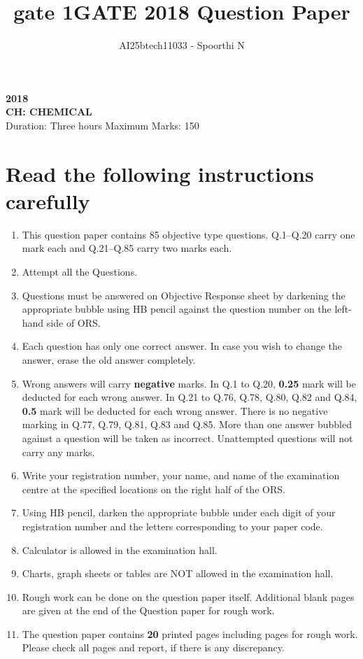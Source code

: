 \documentclass[journal,12pt,onecolumn]{IEEEtran}
\theoremstyle{remark}
\begin{document}
\title{gate 1}
\renewcommand{\thefigure}{\theenumi}
\renewcommand{\thetable}{\theenumi}

\title{GATE 2018 Question Paper}
\author{AI25btech11033 - Spoorthi N}
\maketitle

\begin{center}
\large \textbf{2018}\\[1ex]
\large \textbf{CH: CHEMICAL}\\[2ex]
{Duration: Three hours \hfill Maximum Marks: 150}
\end{center}

\section*{Read the following instructions carefully}
\begin{enumerate}
    \item This question paper contains 85 objective type questions. Q.1--Q.20 carry one mark each and Q.21--Q.85 carry two marks each.
    \item Attempt all the Questions.
    \item Questions must be answered on Objective Response sheet  by darkening the appropriate bubble  using HB pencil against the question number on the left-hand side of ORS.
    \item Each question has only one correct answer. In case you wish to change the answer, erase the old answer completely.
    \item Wrong answers will carry \textbf{negative} marks. In Q.1 to Q.20, \textbf{0.25} mark will be deducted for each wrong answer. In Q.21 to Q.76, Q.78, Q.80, Q.82 and Q.84, \textbf{0.5} mark will be deducted for each wrong answer. There is no negative marking in Q.77, Q.79, Q.81, Q.83 and Q.85. More than one answer bubbled against a question will be taken as incorrect. Unattempted questions will not carry any marks.
    \item Write your registration number, your name, and name of the examination centre at the specified locations on the right half of the ORS.
    \item Using HB pencil, darken the appropriate bubble under each digit of your registration number and the letters corresponding to your paper code.
    \item Calculator is allowed in the examination hall.
    \item Charts, graph sheets or tables are NOT allowed in the examination hall.
    \item Rough work can be done on the question paper itself. Additional blank pages are given at the end of the Question paper for rough work.
    \item The question paper contains \textbf{20} printed pages including pages for rough work. Please check all pages and report, if there is any discrepancy.
\end{enumerate}
\end{document}
